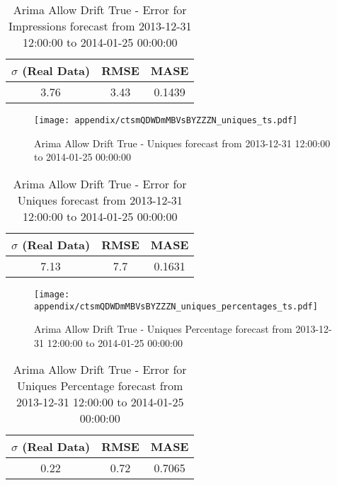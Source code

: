 \begin{table}[H]
\centering
\footnotesize
\begin{tabular}{ccc}
$\sigma$ (Real Data) & RMSE & MASE   \\ \hline
3.76 & 3.43 & 0.1439 \\
\end{tabular}

\vspace{0.5cm}

\caption[]{
Arima Allow Drift True - Error for Impressions forecast from 2013-12-31 12:00:00 to 2014-01-25 00:00:00}
\end{table}

\begin{figure}[H] \begin{center} \leavevmode
\texttt{[image: appendix/ctsmQDWDmMBVsBYZZZN\_uniques\_ts.pdf]} \caption[]{
Arima Allow Drift True - Uniques forecast from 2013-12-31 12:00:00 to 2014-01-25 00:00:00} \label{fig:appendix/ctsmQDWDmMBVsBYZZZN_uniques_ts.pdf} \end{center}
\end{figure}

\begin{table}[H]
\centering
\footnotesize
\begin{tabular}{ccc}
$\sigma$ (Real Data) & RMSE & MASE   \\ \hline
7.13 & 7.7 & 0.1631 \\
\end{tabular}

\vspace{0.5cm}

\caption[]{
Arima Allow Drift True - Error for Uniques forecast from 2013-12-31 12:00:00 to 2014-01-25 00:00:00}
\end{table}

\begin{figure}[H] \begin{center} \leavevmode
\texttt{[image: appendix/ctsmQDWDmMBVsBYZZZN\_uniques\_percentages\_ts.pdf]} \caption[]{
Arima Allow Drift True - Uniques Percentage forecast from 2013-12-31 12:00:00 to 2014-01-25 00:00:00} \label{fig:appendix/ctsmQDWDmMBVsBYZZZN_uniques_percentages_ts.pdf} \end{center}
\end{figure}

\begin{table}[H]
\centering
\footnotesize
\begin{tabular}{ccc}
$\sigma$ (Real Data) & RMSE & MASE   \\ \hline
0.22 & 0.72 & 0.7065 \\
\end{tabular}

\vspace{0.5cm}

\caption[]{
Arima Allow Drift True - Error for Uniques Percentage forecast from 2013-12-31 12:00:00 to 2014-01-25 00:00:00}
\end{table}

